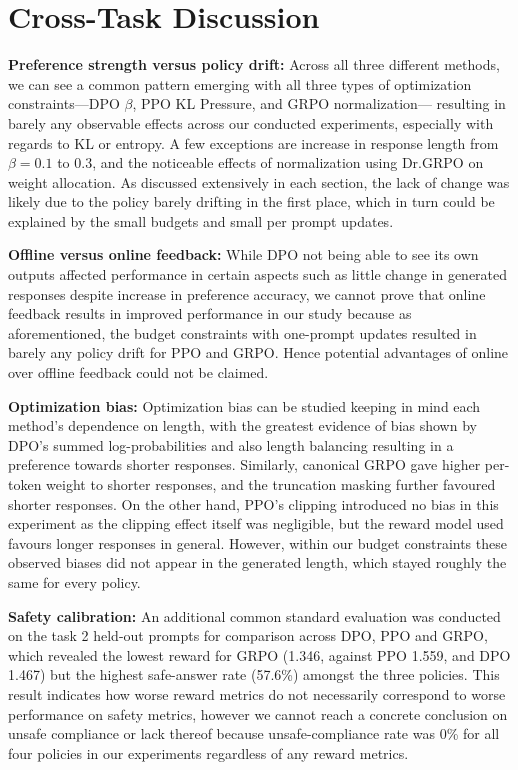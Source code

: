 \documentclass{article}
\begin{document}

\section{Cross-Task Discussion}
\label{sec:discussion}

 \textbf{Preference strength versus policy drift:}
Across all three different methods, we can see a common pattern emerging with all three types of optimization constraints---DPO $\beta$, PPO KL Pressure, and GRPO normalization--- resulting in barely any observable effects across our conducted experiments, especially with regards to KL or entropy. A few exceptions are increase in response length from $\beta = 0.1$ to $0.3$,  and the noticeable effects of normalization using Dr.GRPO on weight allocation. As discussed extensively in each section, the lack of change was likely due to the policy barely drifting in the first place, which in turn could be explained by the small budgets and small per prompt updates.

 \textbf{Offline versus online feedback:}
 While DPO not being able to see its own outputs affected performance in certain aspects such as little change in generated responses despite increase in preference accuracy, we cannot prove that online feedback results in improved performance in our study because as aforementioned, the budget constraints with one-prompt updates resulted in barely any policy drift for PPO and GRPO. Hence potential advantages of online over offline feedback could not be claimed.

 \textbf{Optimization bias:}
Optimization bias can be studied keeping in mind each method's dependence on length, with the greatest evidence of bias shown by DPO's summed log-probabilities and also length balancing resulting in a preference towards shorter responses. Similarly, canonical GRPO gave higher per-token weight to shorter responses, and the truncation masking further favoured shorter responses. On the other hand, PPO's clipping introduced no bias in this experiment as the clipping effect itself was negligible, but the reward model used favours longer responses in general. However, within our budget constraints these observed biases did not appear in the generated length, which stayed roughly the same for every policy.

 \textbf{Safety calibration:}
An additional common standard evaluation was conducted on the task 2 held-out prompts for comparison across DPO, PPO and GRPO, which revealed the lowest reward for GRPO (1.346, against PPO 1.559, and DPO 1.467) but the highest safe-answer rate (57.6\%)  amongst the three policies. This result indicates how worse reward metrics do not necessarily correspond to worse performance on safety metrics, however we cannot reach a concrete conclusion on unsafe compliance or lack thereof because unsafe-compliance rate was 0\% for all four policies in our experiments regardless of any reward metrics.
\end{document}
